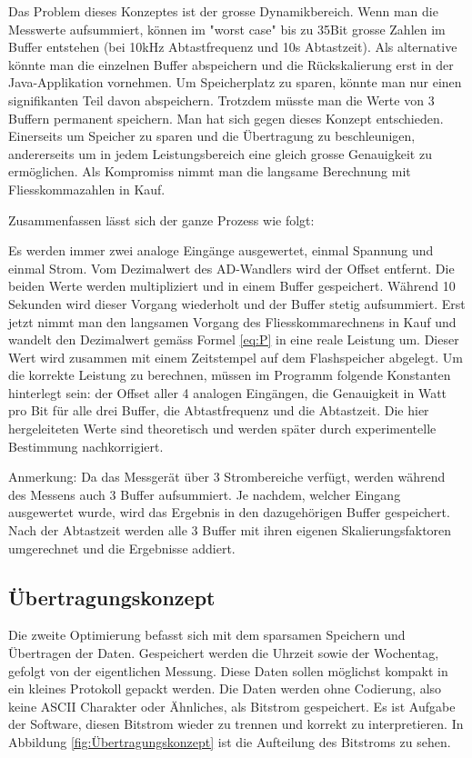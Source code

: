Das Problem dieses Konzeptes ist der grosse Dynamikbereich. Wenn man die Messwerte aufsummiert, können im "worst case" bis zu 35Bit grosse Zahlen im Buffer entstehen (bei 10kHz Abtastfrequenz und 10s Abtastzeit). Als alternative könnte man die einzelnen Buffer abspeichern und die Rückskalierung erst in der Java-Applikation vornehmen. Um Speicherplatz zu sparen, könnte man nur einen signifikanten Teil davon abspeichern. Trotzdem müsste man die Werte von 3 Buffern permanent speichern. Man hat sich gegen dieses Konzept entschieden. Einerseits um Speicher zu sparen und die Übertragung zu beschleunigen, andererseits um in jedem Leistungsbereich eine gleich grosse Genauigkeit zu ermöglichen. Als Kompromiss nimmt man die langsame Berechnung mit Fliesskommazahlen in Kauf.

Zusammenfassen lässt sich der ganze Prozess wie folgt:

Es werden immer zwei analoge Eingänge ausgewertet, einmal Spannung und einmal Strom. Vom Dezimalwert des AD-Wandlers wird der Offset entfernt. Die beiden Werte werden multipliziert und in einem Buffer gespeichert. Während 10 Sekunden wird dieser Vorgang wiederholt und der Buffer stetig aufsummiert. Erst jetzt nimmt man den langsamen Vorgang des Fliesskommarechnens in Kauf und wandelt den Dezimalwert gemäss Formel \ref{eq:P} in eine reale Leistung um. Dieser Wert wird zusammen mit einem Zeitstempel auf dem Flashspeicher abgelegt. Um die korrekte Leistung zu berechnen, müssen im Programm folgende Konstanten hinterlegt sein: der Offset aller 4 analogen Eingängen, die Genauigkeit in Watt pro Bit für alle drei Buffer, die Abtastfrequenz und die Abtastzeit. Die hier hergeleiteten Werte sind theoretisch und werden später durch experimentelle Bestimmung nachkorrigiert.

Anmerkung: Da das Messgerät über 3 Strombereiche verfügt, werden während des Messens auch 3 Buffer aufsummiert. Je nachdem, welcher Eingang ausgewertet wurde, wird das Ergebnis in den dazugehörigen Buffer gespeichert. Nach der Abtastzeit werden alle 3 Buffer mit ihren eigenen Skalierungsfaktoren umgerechnet und die Ergebnisse addiert.

\subsection{Übertragungskonzept}

Die zweite Optimierung befasst sich mit dem sparsamen Speichern und Übertragen der Daten. Gespeichert werden die Uhrzeit sowie der Wochentag, gefolgt von der eigentlichen Messung. Diese Daten sollen möglichst kompakt in ein kleines Protokoll gepackt werden. Die Daten werden ohne Codierung, also keine ASCII Charakter oder Ähnliches, als Bitstrom gespeichert. Es ist Aufgabe der Software, diesen Bitstrom wieder zu trennen und korrekt zu interpretieren. In Abbildung \ref{fig:Übertragungskonzept} ist die Aufteilung des Bitstroms zu sehen.

